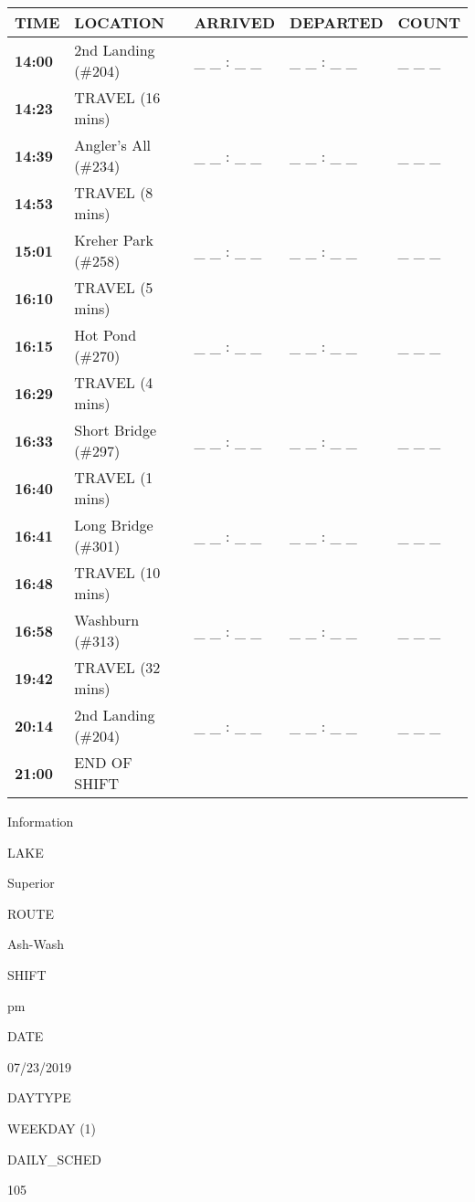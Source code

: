 \documentclass[]{article}
\begin{document}
\begin{tabular}{>{\bfseries}lllll}
\toprule
\textbf{TIME} & \textbf{LOCATION} & \textbf{ARRIVED} & \textbf{DEPARTED} & \textbf{COUNT}\\
\midrule
14:00 & 2nd Landing (\#204) & \_ \_ : \_ \_ & \_ \_ : \_ \_ & \_ \_ \_\\
14:23 & TRAVEL (16 mins) &  &  & \\
14:39 & Angler's All (\#234) & \_ \_ : \_ \_ & \_ \_ : \_ \_ & \_ \_ \_\\
14:53 & TRAVEL (8 mins) &  &  & \\
15:01 & Kreher Park (\#258) & \_ \_ : \_ \_ & \_ \_ : \_ \_ & \_ \_ \_\\
16:10 & TRAVEL (5 mins) &  &  & \\
16:15 & Hot Pond (\#270) & \_ \_ : \_ \_ & \_ \_ : \_ \_ & \_ \_ \_\\
16:29 & TRAVEL (4 mins) &  &  & \\
16:33 & Short Bridge (\#297) & \_ \_ : \_ \_ & \_ \_ : \_ \_ & \_ \_ \_\\
16:40 & TRAVEL (1 mins) &  &  & \\
16:41 & Long Bridge (\#301) & \_ \_ : \_ \_ & \_ \_ : \_ \_ & \_ \_ \_\\
16:48 & TRAVEL (10 mins) &  &  & \\
16:58 & Washburn (\#313) & \_ \_ : \_ \_ & \_ \_ : \_ \_ & \_ \_ \_\\
19:42 & TRAVEL (32 mins) &  &  & \\
20:14 & 2nd Landing (\#204) & \_ \_ : \_ \_ & \_ \_ : \_ \_ & \_ \_ \_\\
21:00 & END OF SHIFT &  &  & \\
\bottomrule
\end{tabular}\newpage

Information

LAKE

Superior

ROUTE

Ash-Wash

SHIFT

pm

DATE

07/23/2019

DAYTYPE

WEEKDAY (1)

DAILY\_SCHED

105

\vspace{24pt}
\end{document}
